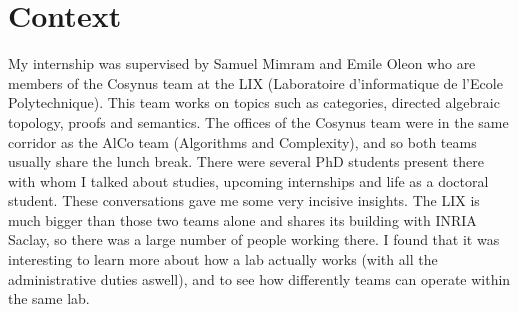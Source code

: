 \documentclass{report}
\begin{document}
\section*{Context}
My internship was supervised by Samuel Mimram and Emile Oleon who are members of the Cosynus team at the LIX (Laboratoire d'informatique de l'Ecole Polytechnique). This team works on topics such as categories, directed algebraic topology, proofs and semantics. The offices of the Cosynus team were in the same corridor as the AlCo team (Algorithms and Complexity), and so both teams usually share the lunch break. There were several PhD students present there with whom I talked about studies, upcoming internships and life as a doctoral student. These conversations gave me some very incisive insights. The LIX is much bigger than those two teams alone and shares its building with INRIA Saclay, so there was a large number of people working there. I found that it was interesting to learn more about how a lab actually works (with all the administrative duties aswell), and to see how differently teams can operate within the same lab.
\end{document}
